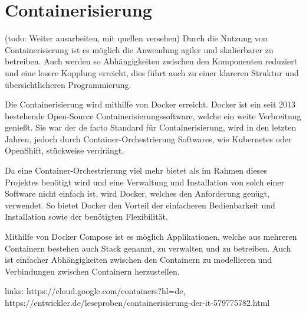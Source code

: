 \section{Containerisierung} \label{sec:Containerisierung}
(todo: Weiter ausarbeiten, mit quellen versehen)
Durch die Nutzung von Containerisierung ist es möglich die Anwendung agiler und skalierbarer zu betreiben. Auch werden so Abhängigkeiten zwischen den Komponenten reduziert und eine losere Kopplung erreicht, dies führt auch zu einer klareren Struktur und übersichtlicheren Programmierung.

Die Containerisierung wird mithilfe von Docker erreicht. Docker ist ein seit 2013 bestehende Open-Source Containerisierungssoftware, welche ein weite Verbreitung genießt. Sie war der de facto Standard für Containerisierung, wird in den letzten Jahren, jedoch durch Container-Orchestrierung Softwares, wie Kubernetes oder OpenShift, stückweise verdrängt.

Da eine Container-Orchestrierung viel mehr bietet als im Rahmen dieses Projektes benötigt wird und eine Verwaltung und Installation von solch einer Software nicht einfach ist, wird Docker, welches den Anforderung genügt, verwendet. So bietet Docker den Vorteil der einfacheren Bedienbarkeit und Installation sowie der benötigten Flexibilität.

Mithilfe von Docker Compose ist es möglich Applikationen, welche aus mehreren Containern bestehen auch Stack genannt, zu verwalten und zu betreiben.
Auch ist einfacher Abhängigkeiten zwischen den Containern zu modellieren und Verbindungen zwischen Containern herzustellen.

links: https://cloud.google.com/containers?hl=de, https://entwickler.de/leseproben/containerisierung-der-it-579775782.html